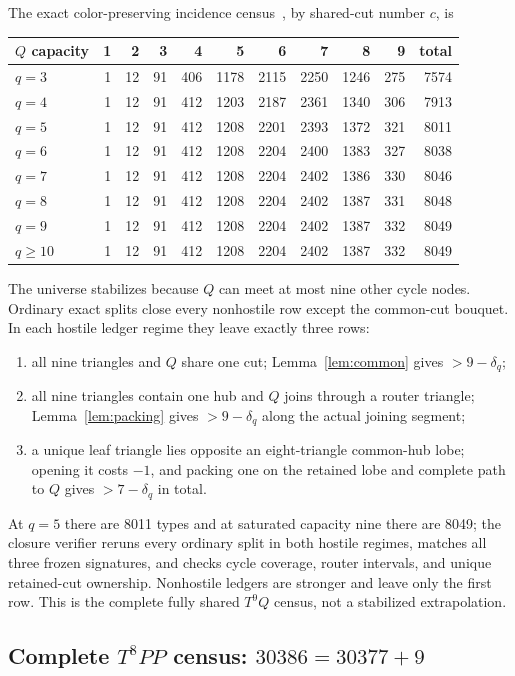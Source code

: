 \documentclass[11pt]{article}
\begin{document}
The exact color-preserving incidence census~\cite{SharedCensus,T9QCode}, by
shared-cut number $c$, is
\begin{center}
\small
\begin{tabular}{lrrrrrrrrr|r}
\toprule
$Q$ capacity&1&2&3&4&5&6&7&8&9&total\\
\midrule
$q=3$&1&12&91&406&1178&2115&2250&1246&275&7574\\
$q=4$&1&12&91&412&1203&2187&2361&1340&306&7913\\
$q=5$&1&12&91&412&1208&2201&2393&1372&321&8011\\
$q=6$&1&12&91&412&1208&2204&2400&1383&327&8038\\
$q=7$&1&12&91&412&1208&2204&2402&1386&330&8046\\
$q=8$&1&12&91&412&1208&2204&2402&1387&331&8048\\
$q=9$&1&12&91&412&1208&2204&2402&1387&332&8049\\
$q\geq10$&1&12&91&412&1208&2204&2402&1387&332&8049\\
\bottomrule
\end{tabular}
\end{center}
The universe stabilizes because $Q$ can meet at most nine other cycle nodes.
Ordinary exact splits close every nonhostile row except the common-cut bouquet.
In each hostile ledger regime they leave exactly three rows:
\begin{enumerate}
\item all nine triangles and $Q$ share one cut; Lemma~\ref{lem:common} gives
      $>9-\delta_q$;
\item all nine triangles contain one hub and $Q$ joins through a router
      triangle; Lemma~\ref{lem:packing} gives $>9-\delta_q$ along the actual
      joining segment;
\item a unique leaf triangle lies opposite an eight-triangle common-hub lobe;
      opening it costs $-1$, and packing one on the retained lobe and complete
      path to $Q$ gives $>7-\delta_q$ in total.
\end{enumerate}
At $q=5$ there are 8011 types and at saturated capacity nine there are 8049;
the closure verifier reruns every ordinary split in both hostile regimes,
matches all three frozen signatures, and checks cycle coverage, router
intervals, and unique retained-cut ownership.  Nonhostile ledgers are stronger
and leave only the first row.  This is the complete fully shared $T^9Q$
census, not a stabilized extrapolation.

\subsection{Complete \texorpdfstring{$T^8PP$}{T8PP} census:
\texorpdfstring{$30386=30377+9$}{30386 = 30377 + 9}}
\end{document}
